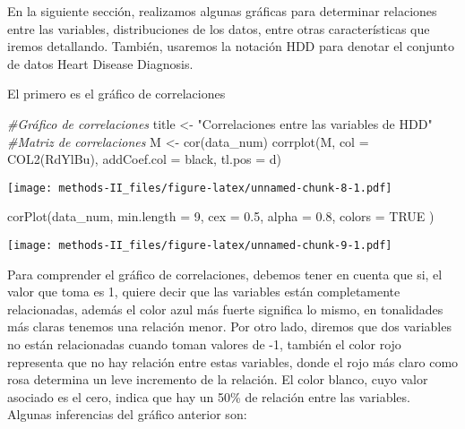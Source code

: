 \documentclass[
]{article}
\newenvironment{Shaded}{\begin{snugshade}}{\end{snugshade}}
\newcommand{\AttributeTok}[1]{\textcolor[rgb]{0.77,0.63,0.00}{#1}}
\newcommand{\CommentTok}[1]{\textcolor[rgb]{0.56,0.35,0.01}{\textit{#1}}}
\newcommand{\ConstantTok}[1]{\textcolor[rgb]{0.00,0.00,0.00}{#1}}
\newcommand{\DecValTok}[1]{\textcolor[rgb]{0.00,0.00,0.81}{#1}}
\newcommand{\FloatTok}[1]{\textcolor[rgb]{0.00,0.00,0.81}{#1}}
\newcommand{\FunctionTok}[1]{\textcolor[rgb]{0.00,0.00,0.00}{#1}}
\newcommand{\NormalTok}[1]{#1}
\newcommand{\OtherTok}[1]{\textcolor[rgb]{0.56,0.35,0.01}{#1}}
\newcommand{\StringTok}[1]{\textcolor[rgb]{0.31,0.60,0.02}{#1}}
\begin{document}
En la siguiente sección, realizamos algunas gráficas para determinar
relaciones entre las variables, distribuciones de los datos, entre otras
características que iremos detallando. También, usaremos la notación HDD
para denotar el conjunto de datos Heart Disease Diagnosis.

El primero es el gráfico de correlaciones

\begin{Shaded}
\begin{Highlighting}[]
\CommentTok{\#Gráfico de correlaciones}
\NormalTok{title }\OtherTok{\textless{}{-}} \StringTok{"Correlaciones entre las variables de HDD"}
\CommentTok{\#Matriz de correlaciones}
\NormalTok{M }\OtherTok{\textless{}{-}} \FunctionTok{cor}\NormalTok{(data\_num)}
\FunctionTok{corrplot}\NormalTok{(M, }\AttributeTok{col =} \FunctionTok{COL2}\NormalTok{(}\StringTok{\textquotesingle{}RdYlBu\textquotesingle{}}\NormalTok{), }\AttributeTok{addCoef.col =} \StringTok{\textquotesingle{}black\textquotesingle{}}\NormalTok{, }\AttributeTok{tl.pos =} \StringTok{\textquotesingle{}d\textquotesingle{}}\NormalTok{)}
\end{Highlighting}
\end{Shaded}

\texttt{[image: methods-II\_files/figure-latex/unnamed-chunk-8-1.pdf]}

\begin{Shaded}
\begin{Highlighting}[]
\FunctionTok{corPlot}\NormalTok{(data\_num, }\AttributeTok{min.length =} \DecValTok{9}\NormalTok{, }\AttributeTok{cex =} \FloatTok{0.5}\NormalTok{, }\AttributeTok{alpha =} \FloatTok{0.8}\NormalTok{, }\AttributeTok{colors =} \ConstantTok{TRUE}\NormalTok{ )}
\end{Highlighting}
\end{Shaded}

\texttt{[image: methods-II\_files/figure-latex/unnamed-chunk-9-1.pdf]}

Para comprender el gráfico de correlaciones, debemos tener en cuenta que
si, el valor que toma es 1, quiere decir que las variables están
completamente relacionadas, además el color azul más fuerte significa lo
mismo, en tonalidades más claras tenemos una relación menor. Por otro
lado, diremos que dos variables no están relacionadas cuando toman
valores de -1, también el color rojo representa que no hay relación
entre estas variables, donde el rojo más claro como rosa determina un
leve incremento de la relación. El color blanco, cuyo valor asociado es
el cero, indica que hay un 50\% de relación entre las variables. Algunas
inferencias del gráfico anterior son:
\end{document}
